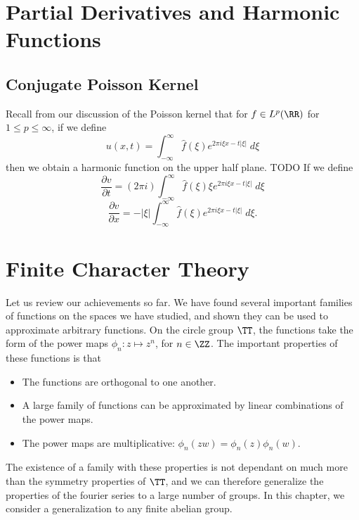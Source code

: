 \chapter{Partial Derivatives and Harmonic Functions}

\section{Conjugate Poisson Kernel}

Recall from our discussion of the Poisson kernel that for $f \in L^p(\RR)$ for $1 \leq p \leq \infty$, if we define
%
\[ u(x,t) = \int_{-\infty}^\infty \widehat{f}(\xi) e^{2 \pi i \xi x - t |\xi|}\; d\xi \]
%
then we obtain a harmonic function on the upper half plane. TODO If we define
%
\[ \frac{\partial v}{\partial t} = (2 \pi i) \int_{-\infty}^\infty \widehat{f}(\xi) \xi e^{2 \pi i \xi x - t |\xi|}\; d\xi \]
\[ \frac{\partial v}{\partial x} = - |\xi| \int_{-\infty}^\infty \widehat{f}(\xi) e^{2 \pi i \xi x - t |\xi|}\; d\xi. \]










\chapter{Finite Character Theory}

Let us review our achievements so far. We have found several important families of functions on the spaces we have studied, and shown they can be used to approximate arbitrary functions. On the circle group $\TT$, the functions take the form of the power maps $\phi_n: z \mapsto z^n$, for $n \in \ZZ$. The important properties of these functions is that
%
\begin{itemize}
    \item The functions are orthogonal to one another.
    \item A large family of functions can be approximated by linear combinations of the power maps.
    \item The power maps are multiplicative: $\phi_n(zw) = \phi_n(z) \phi_n(w)$.
\end{itemize}
%
The existence of a family with these properties is not dependant on much more than the symmetry properties of $\TT$, and we can therefore generalize the properties of the fourier series to a large number of groups. In this chapter, we consider a generalization to any finite abelian group.

